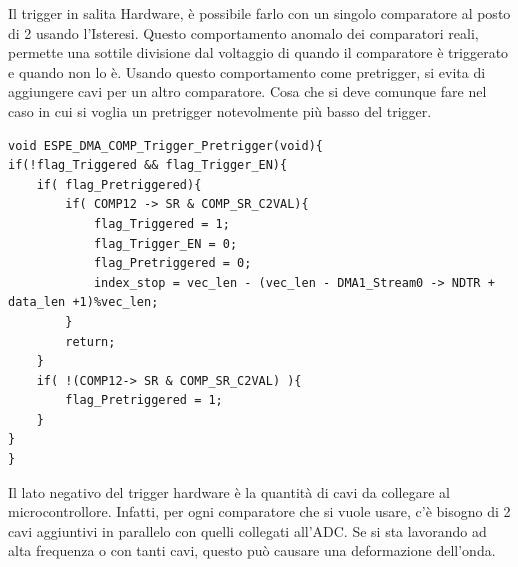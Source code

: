 Il trigger in salita Hardware, è possibile farlo con un singolo comparatore al posto di 2 usando l'Isteresi. Questo comportamento anomalo dei comparatori reali, permette una sottile divisione dal voltaggio di quando il comparatore è triggerato e quando non lo è. Usando questo comportamento come pretrigger, si evita di aggiungere cavi per un altro comparatore. Cosa che si deve comunque fare nel caso in cui si voglia un pretrigger notevolmente più basso del trigger.

\noindent
\begin{verbatim}
void ESPE_DMA_COMP_Trigger_Pretrigger(void){
if(!flag_Triggered && flag_Trigger_EN){
    if( flag_Pretriggered){
        if( COMP12 -> SR & COMP_SR_C2VAL){
            flag_Triggered = 1;
            flag_Trigger_EN = 0;
            flag_Pretriggered = 0;
            index_stop = vec_len - (vec_len - DMA1_Stream0 -> NDTR + data_len +1)%vec_len;
        }
        return;
    }
    if( !(COMP12-> SR & COMP_SR_C2VAL) ){
        flag_Pretriggered = 1;
    }
}
}
\end{verbatim}

Il lato negativo del trigger hardware è la quantità di cavi da collegare al microcontrollore. Infatti, per ogni comparatore che si vuole usare, c'è bisogno di 2 cavi aggiuntivi in parallelo con quelli collegati all'ADC. Se si sta lavorando ad alta frequenza o con tanti cavi, questo può causare una deformazione dell'onda.